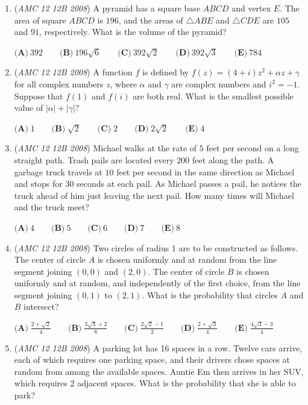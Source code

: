 \begin{enumerate}
	\item (\textit{AMC 12 12B 2008}) A pyramid has a square base $ABCD$ and vertex $E$.  The area of square $ABCD$ is $196$, and the areas of $\triangle ABE$ and $\triangle CDE$ are $105$ and $91$, respectively.  What is the volume of the pyramid?


 $\textbf{(A)}\ 392 \qquad \textbf{(B)}\ 196\sqrt {6} \qquad \textbf{(C)}\ 392\sqrt {2} \qquad \textbf{(D)}\ 392\sqrt {3} \qquad \textbf{(E)}\ 784$


	\item (\textit{AMC 12 12B 2008}) A function $f$ is defined by $f(z) = (4 + i) z^2 + \alpha z + \gamma$ for all complex numbers $z$, where $\alpha$ and $\gamma$ are complex numbers and $i^2 = - 1$. Suppose that $f(1)$ and $f(i)$ are both real. What is the smallest possible value of $| \alpha | + |\gamma |$?


 $\textbf{(A)} \; 1 \qquad \textbf{(B)} \; \sqrt {2} \qquad \textbf{(C)} \; 2 \qquad \textbf{(D)} \; 2 \sqrt {2} \qquad \textbf{(E)} \; 4 \qquad$


	\item (\textit{AMC 12 12B 2008}) Michael walks at the rate of $5$ feet per second on a long straight path. Trash pails are located every $200$ feet along the path. A garbage truck travels at $10$ feet per second in the same direction as Michael and stops for $30$ seconds at each pail. As Michael passes a pail, he notices the truck ahead of him just leaving the next pail. How many times will Michael and the truck meet?


 $\textbf{(A)}\ 4\qquad \textbf{(B)}\ 5\qquad \textbf{(C)}\ 6\qquad \textbf{(D)}\ 7\qquad \textbf{(E)}\ 8$


	\item (\textit{AMC 12 12B 2008}) Two circles of radius 1 are to be constructed as follows. The center of circle $A$ is chosen uniformly and at random from the line segment joining $(0,0)$ and $(2,0)$. The center of circle $B$ is chosen uniformly and at random, and independently of the first choice, from the line segment joining $(0,1)$ to $(2,1)$. What is the probability that circles $A$ and $B$ intersect?


 $\textbf{(A)} \; \frac {2 + \sqrt {2}}{4} \qquad \textbf{(B)} \; \frac {3\sqrt {3} + 2}{8} \qquad \textbf{(C)} \; \frac {2 \sqrt {2} - 1}{2} \qquad \textbf{(D)} \; \frac {2 + \sqrt {3}}{4} \qquad \textbf{(E)} \; \frac {4 \sqrt {3} - 3}{4}$


	\item (\textit{AMC 12 12B 2008}) A parking lot has 16 spaces in a row. Twelve cars arrive, each of which requires one parking space, and their drivers chose spaces at random from among the available spaces. Auntie Em then arrives in her SUV, which requires 2 adjacent spaces. What is the probability that she is able to park?



\end{enumerate}
